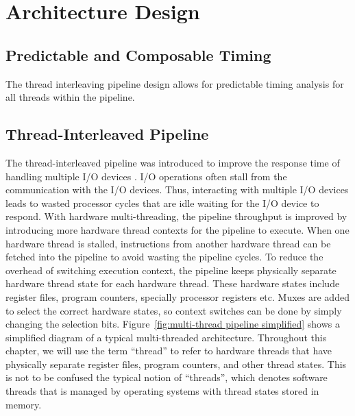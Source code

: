 \section{Architecture Design} 

\subsection{Predictable and Composable Timing}
The thread interleaving pipeline design allows for predictable timing analysis for all threads within the pipeline.

\subsection{Thread-Interleaved Pipeline}
\label{subsection:pret_thread_pipeline}
The thread-interleaved pipeline was introduced to improve the response time of handling multiple I/O devices .
I/O operations often stall from the communication with the I/O devices.
Thus, interacting with multiple I/O devices leads to wasted processor cycles that are idle waiting for the I/O device to respond.
With hardware multi-threading, the pipeline throughput is improved by introducing more hardware thread contexts for the pipeline to execute. 
When one hardware thread is stalled, instructions from another hardware thread can be fetched into the pipeline to avoid wasting the pipeline cycles. 
To reduce the overhead of switching execution context, the pipeline keeps physically separate hardware thread state for each hardware thread. 
These hardware states include register files, program counters, specially processor registers etc. 
Muxes are added to select the correct hardware states, so context switches can be done by simply changing the selection bits. 
Figure~\ref{fig:multi-thread pipeline simplified} shows a simplified diagram of a typical multi-threaded architecture.    
Throughout this chapter, we will use the term ``thread'' to refer to hardware threads that have physically separate register files, program counters, and other thread states.
This is not to be confused the typical notion of ``threads'', which denotes software threads that is managed by operating systems with thread states stored in memory.  
